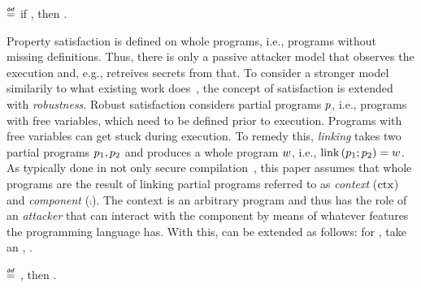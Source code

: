 \documentclass[utf8,acmsmall,review,screen,dvipsnames]{acmart}
\begin{document}
\begin{definition}\label{def:propsat}
  \bul{$\sat{\progvar}{\pi}$}
  $\isdef$
  if \iul{$\progstepto{\wholeprogvar}{\runtimetermvar}{\trace}$},
  then \oul{$\trace\in\pi$}.
\end{definition}

Property satisfaction is defined on whole programs, i.e., programs without missing definitions.
Thus, there is only a passive attacker model that observes the execution and, e.g., retreives secrets from that.
To consider a stronger model similarily to what existing work does~\cite{abate2019jour,abate2021extacc,patrignani2021rsc}, the concept of satisfaction is extended with {\em robustness}.
Robust satisfaction considers partial programs $\progvar$, i.e., programs with free variables, which need to be defined prior to execution.
Programs with free variables can get stuck during execution.
To remedy this, {\em linking} takes two partial programs $\progvar[_{1}],\progvar[_{2}]$ and produces a whole program $\wholeprogvar$, i.e., $\link{\progvar[_{1}]}{\progvar[_{2}]}=\wholeprogvar$.
As typically done in not only secure compilation~\cite{abate2019jour,devriese2018parametricity},  this paper assumes that whole programs are the result of linking partial programs referred to as {\em context} ($\ctx$) and {\em component} ($\comp$).
The context is an arbitrary program and thus has the role of an {\em attacker} that can interact with the component by means of whatever features the programming language has.
With this,  can be extended as follows: for , take an , .

\begin{definition}\label{def:proprsat}
  \bul{$\rsat{\progvar}{\pi}$}
  $\isdef$ , then \oul{$\sat{\wholeprogvar}{\pi}$}.
\end{definition}
\end{document}
